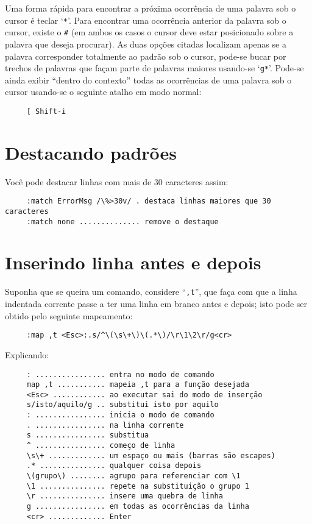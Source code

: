 {\Large {}} Uma forma rápida para encontrar a próxima ocorrência de uma
palavra sob o cursor é teclar `\verb|*|'. Para encontrar uma ocorrência
anterior da palavra sob o cursor, existe o \verb|#| (em ambos os casos o cursor
deve estar posicionado sobre a palavra que deseja procurar). As duas opções
citadas localizam apenas se a palavra corresponder totalmente ao padrão sob o
cursor, pode-se bucar por trechos de palavras que façam parte de palavras
maiores usando-se `\verb+g*+'.  Pode-se ainda exibir ``dentro do contexto''
todas as ocorrências de uma palavra sob o cursor usando-se o seguinte atalho em
modo normal:

\begin{verbatim}
     [ Shift-i
\end{verbatim}

\section{Destacando padrões}
\label{sec:Destacando padrões}
\vimhelp{\%>}

Você pode destacar linhas com mais de 30 caracteres assim:

\begin{verbatim}
     :match ErrorMsg /\%>30v/ . destaca linhas maiores que 30 caracteres
     :match none .............. remove o destaque
\end{verbatim}

\section{Inserindo linha antes e depois}

Suponha que se queira um comando, considere ``\verb|,t|'', que faça com que a
linha indentada corrente passe a ter uma linha em branco antes e depois; isto
pode ser obtido pelo seguinte mapeamento:

\begin{verbatim}
     :map ,t <Esc>:.s/^\(\s\+\)\(.*\)/\r\1\2\r/g<cr>
\end{verbatim}

Explicando:

\begin{verbatim}
     : ................ entra no modo de comando
     map ,t ........... mapeia ,t para a função desejada
     <Esc> ............ ao executar sai do modo de inserção
     s/isto/aquilo/g .. substitui isto por aquilo
     : ................ inicia o modo de comando
     . ................ na linha corrente
     s ................ substitua
     ^ ................ começo de linha
     \s\+ ............. um espaço ou mais (barras são escapes)
     .* ............... qualquer coisa depois
     \(grupo\) ........ agrupo para referenciar com \1
     \1 ............... repete na substituição o grupo 1
     \r ............... insere uma quebra de linha
     g ................ em todas as ocorrências da linha
     <cr> ............. Enter
\end{verbatim}

